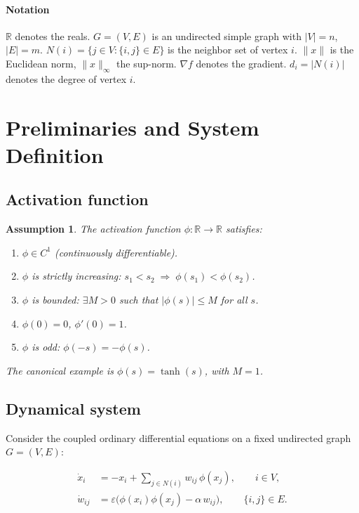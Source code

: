 \documentclass[3p]{elsarticle}
\newtheorem{assumption}{Assumption}
\newcommand{\R}{\mathbb{R}}
\newcommand{\eps}{\varepsilon}
\begin{document}
\paragraph{Notation}
$\R$ denotes the reals. $G=(V,E)$ is an undirected simple graph with $|V|=n$, $|E|=m$. $N(i)=\{j\in V:\{i,j\}\in E\}$ is the neighbor set of vertex $i$. $\|x\|$ is the Euclidean norm, $\|x\|_\infty$ the sup-norm. $\nabla f$ denotes the gradient. $d_i = |N(i)|$ denotes the degree of vertex $i$.

\section{Preliminaries and System Definition}

\subsection{Activation function}

\begin{assumption} \label{ass:phi}
  The activation function $\phi:\R\to\R$ satisfies:
  \begin{enumerate}[label=(A\arabic*), ref=(A\arabic*)]
  \item $\phi\in C^1$ (continuously differentiable). \label{ass:phiC1}
  \item $\phi$ is strictly increasing: $s_1<s_2\;\Longrightarrow\;\phi(s_1)<\phi(s_2)$. \label{ass:phiInc}
  \item $\phi$ is bounded: $\exists M>0$ such that $|\phi(s)|\le M$ for all $s$. \label{ass:phiBdd}
  \item $\phi(0)=0$, $\phi'(0)=1$. \label{ass:phiNorm}
  \item $\phi$ is odd: $\phi(-s)=-\phi(s)$. \label{ass:phiOdd}
  \end{enumerate}
  The canonical example is $\phi(s)=\tanh(s)$, with $M=1$.
\end{assumption}

\subsection{Dynamical system}

Consider the coupled ordinary differential equations on a fixed undirected graph $G=(V,E)$:

\begin{align}
  \dot x_i &= -x_i + \sum_{j\in N(i)} w_{ij}\,\phi(x_j), \qquad i\in V, \label{eq:dx}\\
  \dot w_{ij} &= \eps\bigl(\phi(x_i)\phi(x_j) - \alpha\, w_{ij}\bigr), \qquad \{i,j\}\in E. \label{eq:dw}
\end{align}
\end{document}
